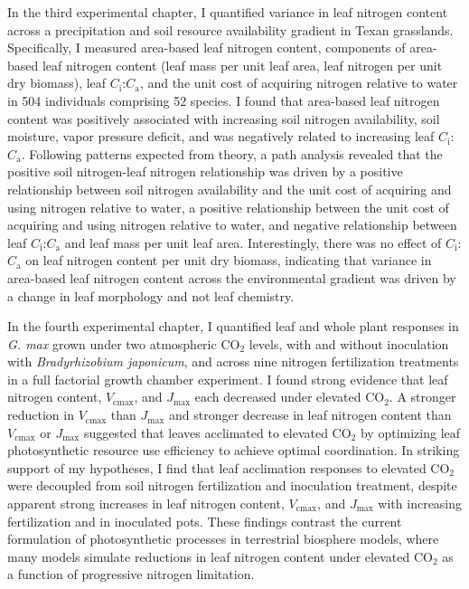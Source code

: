 In the third experimental chapter, I quantified variance in leaf nitrogen content across a precipitation and soil resource availability gradient in Texan grasslands. Specifically, I measured area-based leaf nitrogen content, components of area-based leaf nitrogen content (leaf mass per unit leaf area, leaf nitrogen per unit dry biomass), leaf $C_\mathrm{i}$:$C_\mathrm{a}$, and the unit cost of acquiring nitrogen relative to water in 504 individuals comprising 52 species. I found that area-based leaf nitrogen content was positively associated with increasing soil nitrogen availability, soil moisture, vapor pressure deficit, and was negatively related to increasing leaf $C_\mathrm{i}$:$C_\mathrm{a}$. Following patterns expected from theory, a path analysis revealed that the positive soil nitrogen-leaf nitrogen relationship was driven by a positive relationship between soil nitrogen availability and the unit cost of acquiring and using nitrogen relative to water, a positive relationship between the unit cost of acquiring and using nitrogen relative to water, and negative relationship between leaf $C_\mathrm{i}$:$C_\mathrm{a}$ and leaf mass per unit leaf area. Interestingly, there was no effect of $C_\mathrm{i}$:$C_\mathrm{a}$ on leaf nitrogen content per unit dry biomass, indicating that variance in area-based leaf nitrogen content across the environmental gradient was driven by a change in leaf morphology and not leaf chemistry.

In the fourth experimental chapter, I quantified leaf and whole plant responses in \textit{G. max} grown under two atmospheric CO$_2$ levels, with and without inoculation with \textit{Bradyrhizobium japonicum}, and across nine nitrogen fertilization treatments in a full factorial growth chamber experiment. I found strong evidence that leaf nitrogen content, $V_\mathrm{cmax}$, and $J_\mathrm{max}$ each decreased under elevated CO$_2$. A stronger reduction in $V_\mathrm{cmax}$ than $J_\mathrm{max}$ and stronger decrease in leaf nitrogen content than $V_\mathrm{cmax}$ or $J_\mathrm{max}$ suggested that leaves acclimated to elevated CO$_2$ by optimizing leaf photosynthetic resource use efficiency to achieve optimal coordination. In striking support of my hypotheses, I find that leaf acclimation responses to elevated CO$_2$ were decoupled from soil nitrogen fertilization and inoculation treatment, despite apparent strong increases in leaf nitrogen content, $V_\mathrm{cmax}$, and $J_\mathrm{max}$ with increasing fertilization and in inoculated pots. These findings contrast the current formulation of photosynthetic processes in terrestrial biosphere models, where many models simulate reductions in leaf nitrogen content under elevated CO$_2$ as a function of progressive nitrogen limitation.

